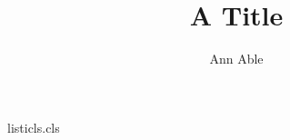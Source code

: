 \begin{filecontents*}[force]{listicls.cls}
\renewcommand\normalsize{\@setfontsize\normalsize\@xpt\@xipt\let\@listi\@listI}
\newcommand\smalllist{\@setfontsize\small\@ixpt{11}\def\@listi{\leftmargin\leftmargini}}
\end{filecontents*}
\documentclass{listicls}
\makeatletter
\protected@xdef{}
\protected@xdef{}
\protected@xdef{}
\makeatother
\title{A Title}\author{Ann Able}
\maketitle
\storedA, \storedB. {\storedC.}

Body text.

